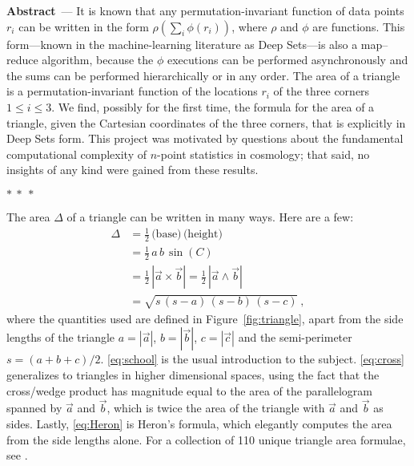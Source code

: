 \documentclass[12pt]{article}
\renewcommand{\paragraph}[1]{\par\addvspace{1.5ex}\noindent\textbf{#1}~---}
\newcommand{\pseudosection}[1]
{\noindent{\color{green!66!black} (\textit{#1})}\par}
\begin{document}
\paragraph{Abstract}
It is known that any permutation-invariant function of data points $r_i$
can be written in the form $\rho(\sum_i\phi(r_i))$,
where $\rho$ and $\phi$ are functions.
This form---known in the machine-learning literature as Deep Sets---is also a map--reduce algorithm, because the $\phi$ executions can be performed asynchronously and the sums can be performed hierarchically or in any order.
The area of a triangle is a permutation-invariant function of the locations $r_i$ of the three corners $1\leq i\leq 3$.
We find, possibly for the first time, the formula for the area of a triangle, given the Cartesian coordinates of the three corners, that is explicitly in Deep Sets form.
This project was motivated by questions about the fundamental computational complexity of $n$-point statistics in cosmology; that said, no insights of any kind were gained from these results.

\bigskip
{\centering $\ast~\ast~\ast$ \par}
\bigskip

\pseudosection{Areas}
\noindent
The area $\Delta$ of a triangle can be written in many ways.
Here are a few:
\begin{align}
\Delta 
&= \frac{1}{2} \, \text{(base)} \, \text{(height)} \label{eq:school} \\
&= \frac{1}{2}\,a\,b\,\sin(C) \label{eq:sine} \\
&= \frac{1}{2}\, \left| \vec{a} \times \vec{b} \right|
    = \frac{1}{2}\, \left| \vec{a} \wedge \vec{b} \right| \label{eq:cross} \\
&= \sqrt{s\,(s-a)\,(s-b)\,(s-c)} \label{eq:Heron} ~,
\end{align}
where the quantities used are defined in Figure~\ref{fig:triangle}, apart from the side lengths of the triangle
$a = | \vec{a} |$, $b = | \vec{b} |$, $c = | \vec{c} |$
and the semi-perimeter $s = (a + b + c)/2$.
\eqref{eq:school} is the usual introduction to the subject.
\eqref{eq:cross} generalizes to triangles in higher dimensional spaces, using the fact that the cross/wedge product has magnitude equal to the area of the parallelogram spanned by $\vec{a}$ and $\vec{b}$, which is twice the area of the triangle with $\vec{a}$ and $\vec{b}$ as sides.
Lastly, \eqref{eq:Heron} is Heron's formula, which elegantly computes the area from the side lengths alone.
For a collection of 110 unique triangle area formulae, see \citet{baker1885a,baker1885b}.
\end{document}

